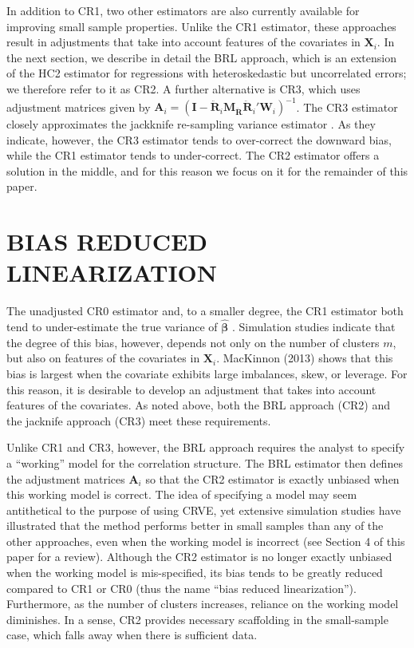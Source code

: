 \documentclass[12pt]{article}\usepackage[]{graphicx}\usepackage[]{color}
\newcommand{\bm}{\mathbf}
\newcommand{\bs}{\boldsymbol}
\begin{document}
In addition to CR1, two other estimators are also currently available for improving small sample properties. 
Unlike the CR1 estimator, these approaches result in adjustments that take into account features of the covariates in $\bm{X}_i$. 
In the next section, we describe in detail the BRL approach, which is an extension of the HC2 estimator for regressions with heteroskedastic but uncorrelated errors; we therefore refer to it as CR2. 
A further alternative is CR3, which uses adjustment matrices given by $\bm{A}_i = \left(\bm{I} - \bm{\ddot{R}}_i \bm{M_{\ddot{R}}}\bm{\ddot{R}}_i'\bm{W}_i\right)^{-1}$. The CR3 estimator closely approximates the jackknife re-sampling variance estimator \citep{Bell2002bias, Mancl2001covariance}. 
As they indicate, however, the CR3 estimator tends to over-correct the downward bias, while the CR1 estimator tends to under-correct. 
The CR2 estimator offers a solution in the middle, and for this reason we focus on it for the remainder of this paper. 

\section{BIAS REDUCED LINEARIZATION}
\label{sec:BRL}

The unadjusted CR0 estimator and, to a smaller degree, the CR1 estimator both tend to under-estimate the true variance of $\hat{\bs\beta}$ \citep{Cameron2015practitioners}. Simulation studies indicate that the degree of this bias, however, depends not only on the number of clusters $m$, but also on features of the covariates in $\bm{X}_i$. 
MacKinnon (2013) shows that this bias is largest when the covariate exhibits large imbalances, skew, or leverage. 
For this reason, it is desirable to develop an adjustment that takes into account features of the covariates. 
As noted above, both the BRL approach (CR2) and the jacknife approach (CR3) meet these requirements.

Unlike CR1 and CR3, however, the BRL approach requires the analyst to specify a ``working'' model for the correlation structure. 
The BRL estimator then defines the adjustment matrices $\bm{A}_i$ so that the CR2 estimator is exactly unbiased when this working model is correct. 
The idea of specifying a model may seem antithetical to the purpose of using CRVE, yet extensive simulation studies have illustrated that the method performs better in small samples than any of the other approaches, even when the working model is incorrect (see Section 4 of this paper for a review). 
Although the CR2 estimator is no longer exactly unbiased when the working model is mis-specified, its bias tends to be greatly reduced compared to CR1 or CR0 (thus the name ``bias reduced linearization''). Furthermore, as the number of clusters increases, reliance on the working model diminishes. 
In a sense, CR2 provides necessary scaffolding in the small-sample case, which falls away when there is sufficient data.
\end{document}

